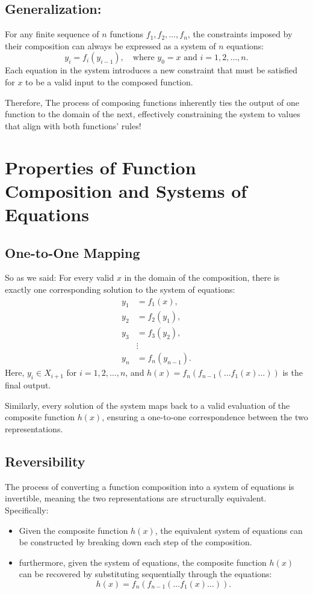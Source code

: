 \documentclass{article}
\begin{document}
\subsection*{Generalization:}
For any finite sequence of \( n \) functions \( f_1, f_2, \dots, f_n \), the constraints imposed by their composition can always be expressed as a system of \( n \) equations:
\[
y_i = f_i(y_{i-1}), \quad \text{where } y_0 = x \text{ and } i = 1, 2, \dots, n.
\]
Each equation in the system introduces a new constraint that must be satisfied for \( x \) to be a valid input to the composed function.

Therefore, The process of composing functions inherently ties the output of one function to the domain of the next, effectively constraining the system to values that align with both functions' rules!

\section*{Properties of Function Composition and Systems of Equations}

\subsection*{One-to-One Mapping}

So as we said: 
For every valid \( x \) in the domain of the composition, there is exactly one corresponding solution to the system of equations:
\[
\begin{aligned}
y_1 &= f_1(x), \\
y_2 &= f_2(y_1), \\
y_3 &= f_3(y_2), \\
&\vdots \\
y_n &= f_n(y_{n-1}).
\end{aligned}
\]
Here, \( y_i \in X_{i+1} \) for \( i = 1, 2, \dots, n \), and \( h(x) = f_n(f_{n-1}(\dots f_1(x) \dots)) \) is the final output.

Similarly, every solution of the system maps back to a valid evaluation of the composite function \( h(x) \), ensuring a one-to-one correspondence between the two representations.

\subsection*{Reversibility}
The process of converting a function composition into a system of equations is invertible, meaning the two representations are structurally equivalent. Specifically:
\begin{itemize}
    \item Given the composite function \( h(x) \), the equivalent system of equations can be constructed by breaking down each step of the composition.
    \item furthermore, given the system of equations, the composite function \( h(x) \) can be recovered by substituting sequentially through the equations:
    \[
    h(x) = f_n(f_{n-1}(\dots f_1(x) \dots)).
    \]
\end{itemize}
\end{document}
